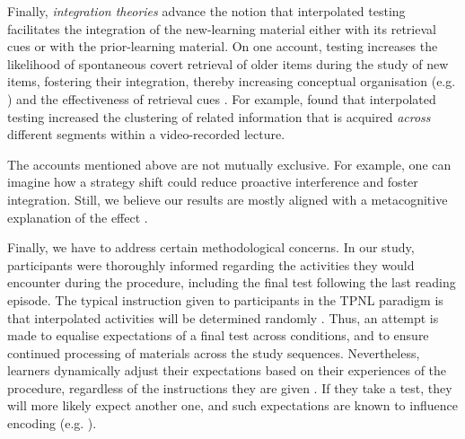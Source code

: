 \documentclass[../main.tex]{subfiles}
\begin{document}
Finally, \textit{integration theories} advance the notion that interpolated 
testing facilitates the integration of the new-learning material either with 
its retrieval cues or with the prior-learning material. On one account, 
testing increases the likelihood of spontaneous covert retrieval of 
older items during the study of new items, fostering their 
integration, thereby increasing conceptual organisation (e.g. 
\citealp{jingInterpolatedTestingInfluences2016}) and the effectiveness of 
retrieval cues \citep{pycWhyTestingImproves2010}. For example, 
\cite{jingInterpolatedTestingInfluences2016} found that interpolated testing 
increased the clustering of related information that is acquired 
\textit{across} different segments within a video-recorded lecture.

The accounts mentioned above are not mutually exclusive. For example, one 
can imagine how a strategy shift could reduce proactive interference and 
foster integration. Still, we believe our results are mostly aligned with a 
metacognitive explanation of the effect \citep{wissmanInterimTestEffect2011, 
chanTestingPotentiatesNew2018}. 

Finally, we have to address certain methodological concerns.  In our study, 
participants were thoroughly informed regarding the activities they would 
encounter during the procedure, including the final test following the last 
reading episode. The typical instruction given to participants in the TPNL 
paradigm is that interpolated activities will be determined randomly
\citep{yangEnhancingLearningRetrieval2018}. Thus, an attempt is made to 
equalise expectations of a final test across conditions, and to ensure 
continued processing of materials across the study sequences. Nevertheless, 
learners dynamically adjust their expectations based on their experiences of 
the procedure, regardless of the instructions they are given 
\citep{weinsteinRoleTestExpectancy2014}.  If they take a test, they will 
more likely expect another one, and such expectations are known to influence 
encoding (e.g. \citealp{szpunarExpectationFinalCumulative2007}). 
\end{document}
